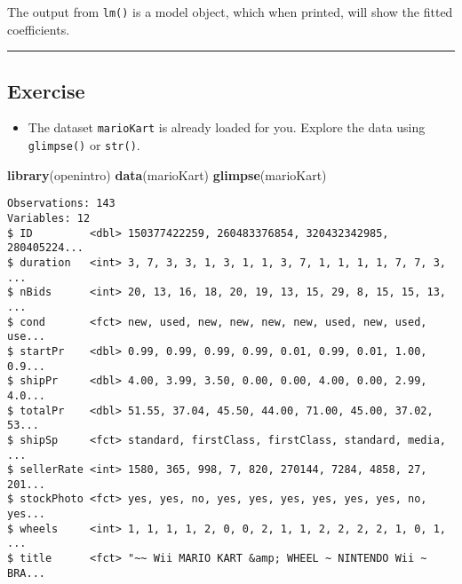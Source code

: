 \documentclass[]{book}
\newenvironment{Shaded}{\begin{snugshade}}{\end{snugshade}}
\newcommand{\KeywordTok}[1]{\textcolor[rgb]{0.13,0.29,0.53}{\textbf{#1}}}
\newcommand{\DecValTok}[1]{\textcolor[rgb]{0.00,0.00,0.81}{#1}}
\newcommand{\StringTok}[1]{\textcolor[rgb]{0.31,0.60,0.02}{#1}}
\newcommand{\CommentTok}[1]{\textcolor[rgb]{0.56,0.35,0.01}{\textit{#1}}}
\newcommand{\OperatorTok}[1]{\textcolor[rgb]{0.81,0.36,0.00}{\textbf{#1}}}
\newcommand{\NormalTok}[1]{#1}
\providecommand{\tightlist}{%
  \setlength{\itemsep}{0pt}\setlength{\parskip}{0pt}}
\begin{document}
The output from \texttt{lm()} is a model object, which when printed,
will show the fitted coefficients.

\begin{center}\rule{0.5\linewidth}{\linethickness}\end{center}

\subsection*{Exercise}\label{exercise}

\begin{itemize}
\tightlist
\item
  The dataset \texttt{marioKart} is already loaded for you. Explore the
  data using \texttt{glimpse()} or \texttt{str()}.
\end{itemize}

\begin{Shaded}
\begin{Highlighting}[]
\KeywordTok{library}\NormalTok{(openintro)}
\KeywordTok{data}\NormalTok{(marioKart)}
\KeywordTok{glimpse}\NormalTok{(marioKart)}
\end{Highlighting}
\end{Shaded}

\begin{verbatim}
Observations: 143
Variables: 12
$ ID         <dbl> 150377422259, 260483376854, 320432342985, 280405224...
$ duration   <int> 3, 7, 3, 3, 1, 3, 1, 1, 3, 7, 1, 1, 1, 1, 7, 7, 3, ...
$ nBids      <int> 20, 13, 16, 18, 20, 19, 13, 15, 29, 8, 15, 15, 13, ...
$ cond       <fct> new, used, new, new, new, new, used, new, used, use...
$ startPr    <dbl> 0.99, 0.99, 0.99, 0.99, 0.01, 0.99, 0.01, 1.00, 0.9...
$ shipPr     <dbl> 4.00, 3.99, 3.50, 0.00, 0.00, 4.00, 0.00, 2.99, 4.0...
$ totalPr    <dbl> 51.55, 37.04, 45.50, 44.00, 71.00, 45.00, 37.02, 53...
$ shipSp     <fct> standard, firstClass, firstClass, standard, media, ...
$ sellerRate <int> 1580, 365, 998, 7, 820, 270144, 7284, 4858, 27, 201...
$ stockPhoto <fct> yes, yes, no, yes, yes, yes, yes, yes, yes, no, yes...
$ wheels     <int> 1, 1, 1, 1, 2, 0, 0, 2, 1, 1, 2, 2, 2, 2, 1, 0, 1, ...
$ title      <fct> "~~ Wii MARIO KART &amp; WHEEL ~ NINTENDO Wii ~ BRA...
\end{verbatim}

\begin{Shaded}
\end{Shaded}
\end{document}
